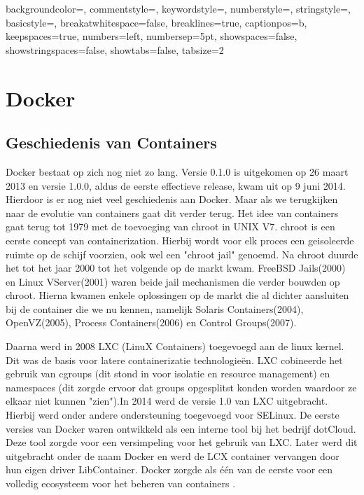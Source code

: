 
{
	backgroundcolor=\color{backcolour},   
	commentstyle=\color{codegreen},
	keywordstyle=\color{red},
	numberstyle=\tiny\color{codegray},
	stringstyle=\color{codepurple},
	basicstyle=\footnotesize,
	breakatwhitespace=false,         
	breaklines=true,                 
	captionpos=b,                    
	keepspaces=true,                 
	numbers=left,                    
	numbersep=5pt,                  
	showspaces=false,                
	showstringspaces=false,
	showtabs=false,                  
	tabsize=2
}


\chapter{Docker}
\section{Geschiedenis van Containers}
Docker bestaat op zich nog niet zo lang. Versie 0.1.0 is uitgekomen op 26 maart 2013 en versie 1.0.0, aldus de eerste effectieve release, kwam uit op 9 juni 2014. Hierdoor is er nog niet veel geschiedenis aan Docker. Maar als we terugkijken naar de evolutie van containers gaat dit verder terug. 
Het idee van containers gaat terug tot 1979 met de toevoeging van chroot in UNIX V7. chroot is een eerste concept van containerization. Hierbij wordt voor elk proces een geisoleerde ruimte op de schijf voorzien, ook wel een "chroot jail" genoemd.
Na chroot duurde het tot het jaar 2000 tot het volgende op de markt kwam. FreeBSD Jails(2000) en Linux VServer(2001) waren beide jail mechanismen die verder bouwden op chroot. Hierna kwamen enkele oplossingen op de markt die al dichter aansluiten bij de container die we nu kennen, namelijk Solaris Containers(2004), OpenVZ(2005), Process Containers(2006) en Control Groups(2007).

Daarna werd in 2008 LXC (LinuX Containers) toegevoegd aan de linux kernel. Dit was de basis voor latere containerizatie technologieën. LXC cobineerde het gebruik van cgroups (dit stond in voor isolatie en resource management) en namespaces (dit zorgde ervoor dat groups opgesplitst konden worden waardoor ze elkaar niet kunnen "zien")\cite{Ellingwood2015}.In 2014 werd de versie 1.0 van LXC uitgebracht. Hierbij werd onder andere ondersteuning toegevoegd voor SELinux. De eerste versies van Docker waren ontwikkeld als een interne tool bij het bedrijf dotCloud. Deze tool zorgde voor een versimpeling voor het gebruik van LXC. Later werd dit uitgebracht onder de naam Docker en werd de LCX container vervangen door hun eigen driver LibContainer. Docker zorgde als één van de eerste voor een volledig ecosysteem voor het beheren van containers \cite{Gunaratne2016}.
 
